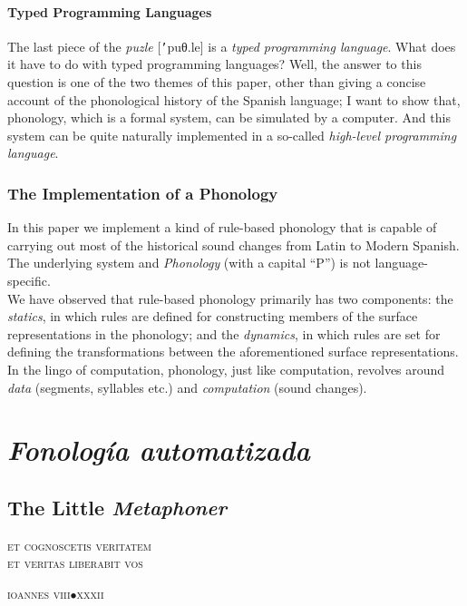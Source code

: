 \documentclass{report}[12pt]
\begin{document}
\subsection{Typed Programming Languages}

The last piece of the \emph{puzle} [\texttt{'}puθ.le] is a \emph{typed programming language}. What does it have to do with typed programming languages? Well, the answer to this question is one of the two themes of this paper, other than giving a concise account of the phonological history of the Spanish language; I want to show that, phonology, which is a formal system, can be simulated by a computer. And this system can be quite naturally implemented in a so-called \emph{high-level programming language}.

\section{The Implementation of a Phonology}

In this paper we implement a kind of rule-based phonology that is capable of carrying out most of the historical sound changes from Latin to Modern Spanish. The underlying system and \emph{Phonology} (with a capital ``P'') is not language-specific. \\
We have observed that rule-based phonology primarily has two components: the \emph{statics}, in which rules are defined for constructing members of the surface representations in the phonology; and the \emph{dynamics}, in which rules are set for defining the transformations between the aforementioned surface representations. In the lingo of computation, phonology, just like computation, revolves around \emph{data} (segments, syllables etc.) and \emph{computation} (sound changes).

\part{\emph{Fonología automatizada}}

\chapter{The Little \emph{Metaphoner}}\label{cap:metaphoner}

\epigraph{\textsc{et cognoscetis veritatem \\ et veritas liberabit vos}}{\textsc{ioannes viii}$\bullet$\textsc{xxxii}}
\end{document}

